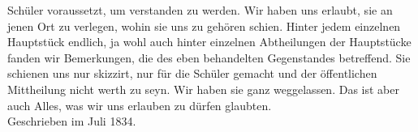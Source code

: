 Schüler voraussetzt, um verstanden zu werden. Wir haben uns erlaubt, sie an jenen Ort zu verlegen, wohin sie uns zu gehören schien. Hinter jedem einzelnen Hauptstück endlich, ja wohl auch hinter einzelnen Abtheilungen der Hauptstücke fanden wir Bemerkungen, die  des eben behandelten Gegenstandes betreffend. Sie schienen uns nur skizzirt, nur für die Schüler gemacht und der öffentlichen Mittheilung nicht werth zu seyn. Wir haben sie ganz weggelassen. Das ist aber auch Alles, was wir uns erlauben zu dürfen glaubten.\\[\baselineskip]
Geschrieben im Juli 1834.\par
\endinput
